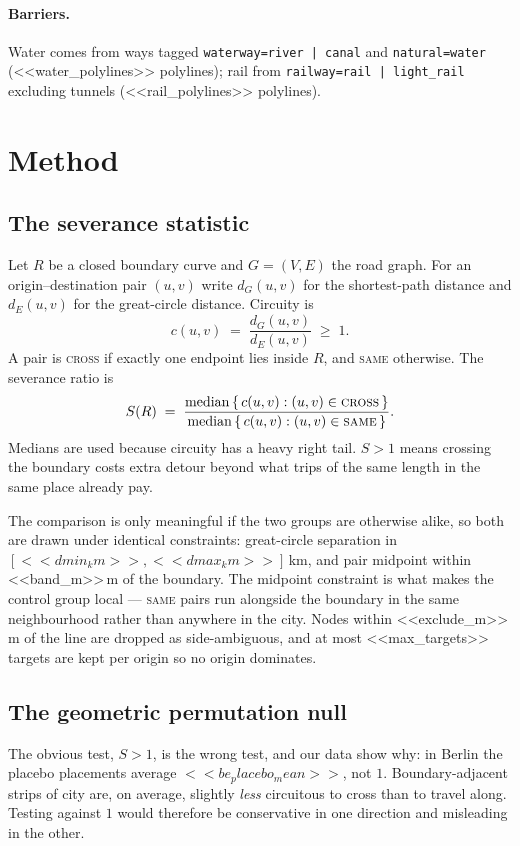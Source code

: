 \documentclass[11pt,a4paper]{article}
\begin{document}
\paragraph{Barriers.} Water comes from ways tagged
\texttt{waterway=river\,|\,canal} and \texttt{natural=water}
(<<water_polylines>> polylines); rail from \texttt{railway=rail\,|\,light\_rail}
excluding tunnels (<<rail_polylines>> polylines).

\section{Method}

\subsection{The severance statistic}\label{sec:stat}

Let $R$ be a closed boundary curve and $G=(V,E)$ the road graph. For an
origin--destination pair $(u,v)$ write $d_G(u,v)$ for the shortest-path distance
and $d_E(u,v)$ for the great-circle distance. Circuity is
\[
  c(u,v) \;=\; \frac{d_G(u,v)}{d_E(u,v)} \;\ge\; 1 .
\]
A pair is \textsc{cross} if exactly one endpoint lies inside $R$, and
\textsc{same} otherwise. The severance ratio is
\[
  S(R) \;=\; \frac{\operatorname{median}\,\{\,c(u,v) : (u,v)\in\textsc{cross}\,\}}
                  {\operatorname{median}\,\{\,c(u,v) : (u,v)\in\textsc{same}\,\}} .
\]
Medians are used because circuity has a heavy right tail. $S>1$ means crossing
the boundary costs extra detour beyond what trips of the same length in the same
place already pay.

The comparison is only meaningful if the two groups are otherwise alike, so both
are drawn under identical constraints: great-circle separation in
$[<<dmin_km>>, <<dmax_km>>]$\,km, and pair midpoint within <<band_m>>\,m of the
boundary. The midpoint constraint is what makes the control group local ---
\textsc{same} pairs run alongside the boundary in the same neighbourhood rather
than anywhere in the city. Nodes within <<exclude_m>>\,m of the line are dropped
as side-ambiguous, and at most <<max_targets>> targets are kept per origin so no
origin dominates.

\subsection{The geometric permutation null}\label{sec:null}

The obvious test, $S>1$, is the wrong test, and our data show why: in Berlin the
placebo placements average $<<be_placebo_mean>>$, not $1$. Boundary-adjacent
strips of city are, on average, slightly \emph{less} circuitous to cross than to
travel along. Testing against $1$ would therefore be conservative in one
direction and misleading in the other.
\end{document}
